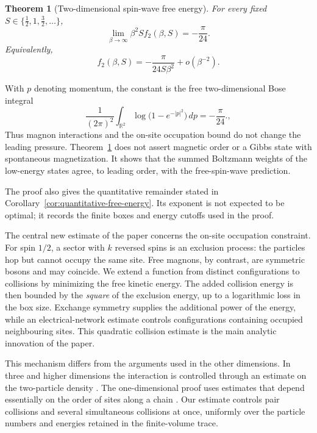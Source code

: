 \documentclass[11pt]{article}
\numberwithin{equation}{section}
\newtheorem{theorem}{Theorem}[section]
\theoremstyle{remark}
\newcommand{\R}{\mathbb R}
\newcommand{\1}{\mathbf 1}
\begin{document}
\begin{theorem}[Two-dimensional spin-wave free energy]
\label{thm:main-free-energy}
For every fixed \(S\in\{\frac12,1,\frac32,\ldots\}\),
\begin{equation}
 \lim_{\beta\to\infty}\beta^2S f_2(\beta,S)
 =-\frac\pi{24}.
 \label{eq:main-limit}
\end{equation}
Equivalently,
\[
 f_2(\beta,S)=-\frac{\pi}{24S\beta^2}+o(\beta^{-2}).
\]
\end{theorem}

With \(p\) denoting momentum, the constant is the free two-dimensional Bose
integral
\begin{equation}
 \frac1{(2\pi)^2}\int_{\R^2}
 \log\bigl(1-e^{-|p|^2}\bigr)\,dp=-\frac\pi{24}.
 \label{eq:bose-integral},
\end{equation}
Thus magnon interactions and the on-site occupation bound do not change
the leading pressure.  Theorem~\ref{thm:main-free-energy} does not assert
magnetic order or a Gibbs state with spontaneous magnetization.  It shows
that the summed Boltzmann weights of the low-energy states agree, to
leading order, with the free-spin-wave prediction.

The proof also gives the quantitative remainder stated in
Corollary~\ref{cor:quantitative-free-energy}.  Its exponent is not expected
to be optimal; it records the finite boxes and energy cutoffs used in the
proof.

The central new estimate of the paper concerns the on-site occupation
constraint.
For spin \(1/2\), a sector with \(k\) reversed spins is an exclusion
process: the particles hop but cannot occupy the same site.  Free magnons,
by contrast, are symmetric bosons and may coincide.  We extend a function
from distinct configurations to collisions by minimizing the free kinetic
energy.  The added collision energy is then bounded by the \emph{square}
of the exclusion energy, up to a logarithmic loss in the box size.
Exchange symmetry supplies the additional power of the energy, while an
electrical-network estimate controls configurations containing occupied
neighbouring sites.  This quadratic collision estimate is the main
analytic innovation of the paper.

This mechanism differs from the arguments used in the other dimensions.
In three and higher dimensions the interaction is controlled through an
estimate on the two-particle density
\cite{CorreggiGiulianiSeiringer2015}.  The one-dimensional proof uses
estimates that depend essentially on the order of sites along a chain
\cite{NapiorkowskiSeiringer2021}.  Our estimate controls pair collisions
and several simultaneous collisions at once, uniformly over the particle
numbers and energies retained in the finite-volume trace.
\end{document}
